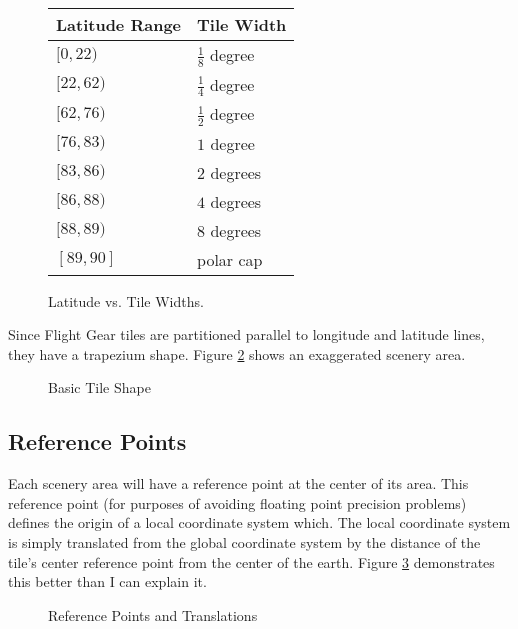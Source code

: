 \documentclass[12pt]{article}
\begin{document}
\begin{figure}[hbt]
 \begin{center}
  \begin{tabular}{||l|l||} \hline
    Latitude Range & Tile Width \\ \hline
    $[0, 22)$  & $\frac{1}{8}$ degree \\ \hline
    $[22, 62)$ & $\frac{1}{4}$ degree \\ \hline
    $[62, 76)$ & $\frac{1}{2}$ degree \\ \hline
    $[76, 83)$ & $1$ degree \\ \hline
    $[83, 86)$ & $2$ degrees \\ \hline
    $[86, 88)$ & $4$ degrees \\ \hline
    $[88, 89)$ & $8$ degrees \\ \hline
    $[89, 90]$ & polar cap \\ \hline
   \hline
  \end{tabular}
 \end{center}

 \caption{Latitude vs. Tile Widths.}
 \label{fig:lats}
\end{figure}


Since Flight Gear tiles are partitioned parallel to longitude and
latitude lines, they have a trapezium shape.  Figure \ref{fig:trap}
shows an exaggerated scenery area.

\begin{figure}[hbt]
  \centerline{                   
  }
  \caption{Basic Tile Shape}
  \label{fig:trap}
\end{figure}

\subsection{Reference Points}

Each scenery area will have a reference point at the center of its
area.  This reference point (for purposes of avoiding floating point
precision problems) defines the origin of a local coordinate system
which.  The local coordinate system is simply translated from the
global coordinate system by the distance of the tile's center
reference point from the center of the earth.  Figure
\ref{fig:reference} demonstrates this better than I can explain it.

\begin{figure}[hbt]
  \centerline{                   
  }
  \caption{Reference Points and Translations}
  \label{fig:reference}
\end{figure}
\end{document}
